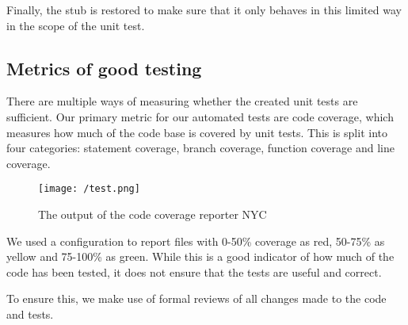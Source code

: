 Finally, the stub is restored to make sure that it only behaves in this limited way in the scope of the unit test.

\subsection{Metrics of good testing}
There are multiple ways of measuring whether the created unit tests are sufficient.
Our primary metric for our automated tests are code coverage, which measures how much of the code base is covered by unit tests.
This is split into four categories: statement coverage, branch coverage, function coverage and line coverage.

\begin{figure}[H]
    \texttt{[image: /test.png]}
     \caption{The output of the code coverage reporter NYC}
     \label{fig:testResults}
 \end{figure}

We used a configuration to report files with 0-50\% coverage as red, 50-75\% as yellow and 75-100\% as green.
While this is a good indicator of how much of the code has been tested, it does not ensure that the tests are useful and correct.

To ensure this, we make use of formal reviews of all changes made to the code and tests.
